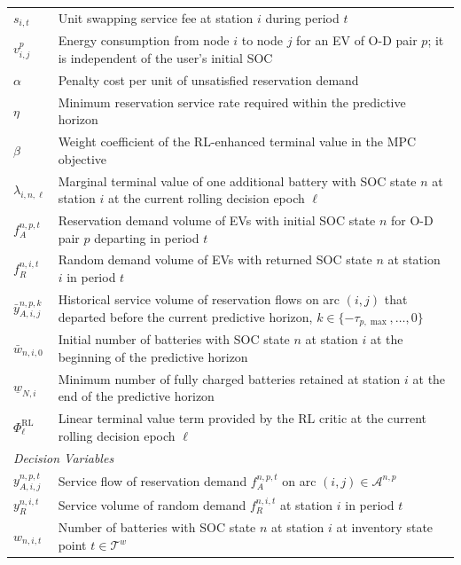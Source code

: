 \documentclass[12pt,hyperref,a4paper,UTF8]{ctexart}
\begin{document}
\begin{table}[!htbp]
\begin{tabular}{@{}lp{13cm}@{}}
    $s_{i,t}$ & Unit swapping service fee at station $i$ during period $t$ \\
    $v^{p}_{i,j}$ & Energy consumption from node $i$ to node $j$ for an EV of O-D pair $p$; it is independent of the user's initial SOC \\
    $\alpha$ & Penalty cost per unit of unsatisfied reservation demand \\
    $\eta$ & Minimum reservation service rate required within the predictive horizon \\
    $\beta$ & Weight coefficient of the RL-enhanced terminal value in the MPC objective \\
    $\lambda_{i,n,\ell}$ & Marginal terminal value of one additional battery with SOC state $n$ at station $i$ at the current rolling decision epoch $\ell$ \\
    $f_{A}^{n,p,t}$ & Reservation demand volume of EVs with initial SOC state $n$ for O-D pair $p$ departing in period $t$ \\
    $f_{R}^{n,i,t}$ & Random demand volume of EVs with returned SOC state $n$ at station $i$ in period $t$ \\
    $\bar{y}_{A,i,j}^{n,p,k}$ & Historical service volume of reservation flows on arc $(i,j)$ that departed before the current predictive horizon, $k\in\{-\tau_{p,\max},\dots,0\}$ \\
    $\bar{w}_{n,i,0}$ & Initial number of batteries with SOC state $n$ at station $i$ at the beginning of the predictive horizon \\
    $\underline{w}_{N,i}$ & Minimum number of fully charged batteries retained at station $i$ at the end of the predictive horizon \\
    $\Phi^{\mathrm{RL}}_{\ell}$ & Linear terminal value term provided by the RL critic at the current rolling decision epoch $\ell$ \\
    \midrule
    \multicolumn{2}{l}{\textit{Decision Variables}} \\
    $y_{A,i,j}^{n,p,t}$ & Service flow of reservation demand $f_{A}^{n,p,t}$ on arc $(i,j)\in\mathcal{A}^{n,p}$ \\
    $y_{R}^{n,i,t}$ & Service volume of random demand $f_{R}^{n,i,t}$ at station $i$ in period $t$ \\
    $w_{n,i,t}$ & Number of batteries with SOC state $n$ at station $i$ at inventory state point $t\in\mathcal{T}^{w}$ \\
    \bottomrule
  \end{tabular}
\end{table}
\end{document}
